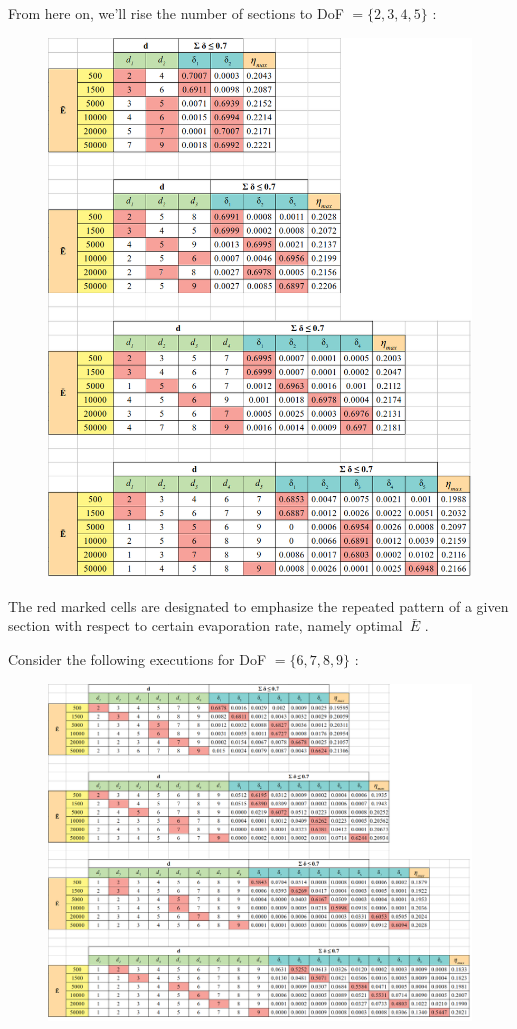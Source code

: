 \documentclass[12pt]{article}
\numberwithin{equation}{section}
\begin{document}
\begin{flushleft}
\newpage
From here on, we'll rise the number of sections to DoF $ = \{2, 3, 4, 5\}$ : 
\begin{figure}[H]
\centering
\includegraphics[width=0.9 \linewidth, center]{eta_07_b.png}
\end{figure}
The red marked cells are designated to emphasize the repeated pattern of a given section with respect to certain evaporation rate, namely optimal \,$\bar{E}$ .

\newpage
Consider the following executions for DoF $ = \{6, 7, 8, 9\}$ : 
\begin{figure}[H] \label{eta_d_6} 
\centering
\includegraphics[width=1.15 \linewidth, center]{eta_07_c.png}
\end{figure}


\end{flushleft}
\end{document}
